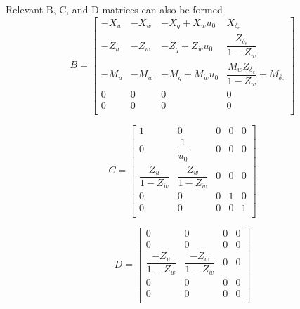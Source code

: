 \documentclass[12pt]{article}
\begin{document}
\noindent Relevant B, C, and D matrices can also be formed
\begin{equation*}
B =
\begin{bmatrix}
   -X_u & -X_w & -X_q + X_{\dot{w}} u_0 & X_{\delta_e} \\
   -Z_u & -Z_w & -Z_q + Z_{\dot{w}} u_0 & \dfrac{Z_{\delta_e}}{1-Z_{\dot{w}}} \\
   -M_u & -M_w & -M_q + M_{\dot{w}} u_0 & \dfrac{M_{\dot{w}} Z_{\delta_e}}{1-Z_{\dot{w}}} + M_{\delta_e} \\
    0   &  0   &  0   & 0 \\
    0   &  0   &  0   & 0 \\
\end{bmatrix}
\end{equation*}

\begin{equation*}
C =
\begin{bmatrix}
    1 & 0     & 0 & 0 & 0\\
    0 & \dfrac{1}{u_0} & 0 & 0 & 0\\
    \dfrac{Z_u}{1-Z_{\dot{w}}} & \dfrac{Z_w}{1-Z_{\dot{w}}} & 0 & 0 & 0\\
    0 & 0     & 0 & 1 & 0\\
    0 & 0     & 0 & 0 & 1\\
\end{bmatrix}
\end{equation*}

\begin{equation*}
D =
\begin{bmatrix}
    0 & 0 & 0 & 0    \\
    0 & 0 & 0 & 0    \\
    \dfrac{-Z_u}{1-Z_{\dot{w}}} & \dfrac{-Z_w}{1-Z_{\dot{w}}} & 0 & 0 \\
    0 & 0 & 0 & 0     \\
    0 & 0 & 0 & 0     \\
\end{bmatrix}
\end{equation*}

\end{document}
